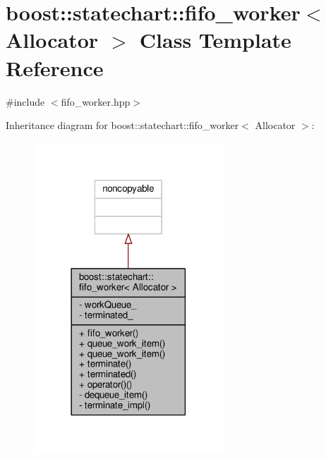 \hypertarget{classboost_1_1statechart_1_1fifo__worker}{}\section{boost\+:\+:statechart\+:\+:fifo\+\_\+worker$<$ Allocator $>$ Class Template Reference}
\label{classboost_1_1statechart_1_1fifo__worker}


{\ttfamily \#include $<$fifo\+\_\+worker.\+hpp$>$}



Inheritance diagram for boost\+:\+:statechart\+:\+:fifo\+\_\+worker$<$ Allocator $>$\+:
\nopagebreak
\begin{figure}[H]
\begin{center}
\leavevmode
\includegraphics[width=201pt]{classboost_1_1statechart_1_1fifo__worker__inherit__graph}
\end{center}
\end{figure}


